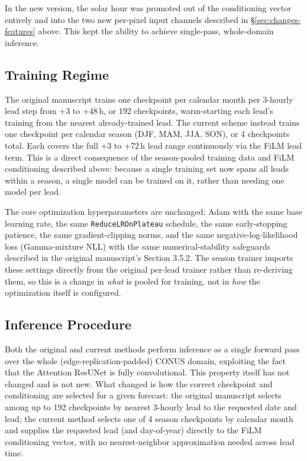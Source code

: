 \documentclass[11pt]{article}
\begin{document}
In the new version, the solar hour was promoted out of the conditioning vector
entirely and into the two new per-pixel input channels described in
\S\ref{sec:changes-features} above.   This kept the ability
to achieve single-pass, whole-domain inference.

\subsection{Training Regime}
\label{sec:changes-training}

The original manuscript trains one checkpoint per calendar month per
3-hourly lead step from +3 to +48\,h, or 192
checkpoints, warm-starting each lead's training from the nearest
already-trained lead. The current scheme instead trains one checkpoint
per calendar season (DJF, MAM, JJA, SON), or 4 checkpoints total.
Each covers the full +3 to +72\,h lead range continuously via the
FiLM lead term. This is a direct consequence of the season-pooled
training data and FiLM conditioning described above: because a single
training set now spans all leads within a season, a single model can
be trained on it, rather than needing one model per lead.

The core optimization hyperparameters are unchanged: Adam with the same
base learning rate, the same \texttt{ReduceLROnPlateau} schedule, the
same early-stopping patience, the same gradient-clipping norms, and the
same negative-log-likelihood loss (Gamma-mixture NLL) with the same
numerical-stability safeguards described in the original manuscript's
Section 3.5.2. The season trainer imports these settings
directly from the original per-lead trainer rather than re-deriving
them, so this is a change in \emph{what} is pooled for training, not in
\emph{how} the optimization itself is configured.

\subsection{Inference Procedure}
\label{sec:changes-inference}

Both the original and current methods perform inference as a single
forward pass over the whole (edge-replication-padded) CONUS domain,
exploiting the fact that the Attention ResUNet is fully convolutional.
This property itself has not changed and is not new. What changed is
how the correct checkpoint and conditioning are selected for a given
forecast: the original manuscript selects among up to 192 checkpoints
by nearest 3-hourly lead to the requested date and lead; the current
method selects one of 4 season checkpoints by calendar month and
supplies the requested lead (and day-of-year) directly to the FiLM
conditioning vector, with no nearest-neighbor approximation needed
across lead time.
\end{document}
